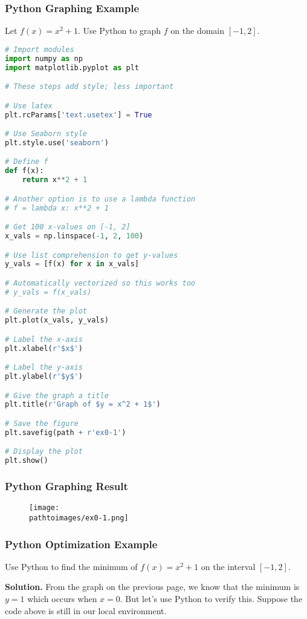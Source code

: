 \documentclass{beamer}
\newcommand{\pathtoimages}{/Users/charlesrambo/Desktop/Bootcamp24/Images}
\begin{document}
\begin{frame}[fragile]
\frametitle{Python Graphing Example}

\begin{example} 
Let $f(x) = x^2 + 1$. Use Python to graph $f$ on the domain $[-1, 2]$.
\end{example}

\begin{multicols}{2}
\begin{lstlisting}[language=Python]
# Import modules 
import numpy as np
import matplotlib.pyplot as plt

# These steps add style; less important

# Use latex
plt.rcParams['text.usetex'] = True

# Use Seaborn style
plt.style.use('seaborn')

# Define f
def f(x):
    return x**2 + 1

# Another option is to use a lambda function
# f = lambda x: x**2 + 1

# Get 100 x-values on [-1, 2]
x_vals = np.linspace(-1, 2, 100)

# Use list comprehension to get y-values
y_vals = [f(x) for x in x_vals]

# Automatically vectorized so this works too
# y_vals = f(x_vals)

# Generate the plot
plt.plot(x_vals, y_vals)

# Label the x-axis
plt.xlabel(r'$x$')

# Label the y-axis
plt.ylabel(r'$y$')

# Give the graph a title
plt.title(r'Graph of $y = x^2 + 1$')

# Save the figure
plt.savefig(path + r'ex0-1')

# Display the plot
plt.show()

\end{lstlisting}

\end{multicols}

\end{frame}

\begin{frame}
\frametitle{Python Graphing Result}
\begin{figure}
\centering
\texttt{[image: \\pathtoimages/ex0-1.png]}
\end{figure}
\end{frame}

\begin{frame}[fragile]
\frametitle{Python Optimization Example}
\begin{example}
Use Python to find the minimum of $f(x) = x^2 + 1$ on the interval $[-1, 2]$.
\end{example}

{\bf Solution.} From the graph on the previous page, we know that the minimum is $y = 1$ which occurs when $x = 0$. But let's use Python to verify this. Suppose the code above is still in our local environment. 

\end{frame}
\end{document}
